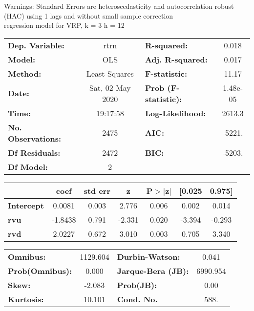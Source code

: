 Warnings: \newline
 [1] Standard Errors are heteroscedasticity and autocorrelation robust (HAC) using 1 lags and without small sample correction\\ 

regression model for VRP, k = 3 h = 12\begin{center}
\begin{tabular}{lclc}
\toprule
\textbf{Dep. Variable:}    &       rtrn       & \textbf{  R-squared:         } &     0.018   \\
\textbf{Model:}            &       OLS        & \textbf{  Adj. R-squared:    } &     0.017   \\
\textbf{Method:}           &  Least Squares   & \textbf{  F-statistic:       } &     11.17   \\
\textbf{Date:}             & Sat, 02 May 2020 & \textbf{  Prob (F-statistic):} &  1.48e-05   \\
\textbf{Time:}             &     19:17:58     & \textbf{  Log-Likelihood:    } &    2613.3   \\
\textbf{No. Observations:} &        2475      & \textbf{  AIC:               } &    -5221.   \\
\textbf{Df Residuals:}     &        2472      & \textbf{  BIC:               } &    -5203.   \\
\textbf{Df Model:}         &           2      & \textbf{                     } &             \\
\bottomrule
\end{tabular}
\begin{tabular}{lcccccc}
                   & \textbf{coef} & \textbf{std err} & \textbf{z} & \textbf{P$> |$z$|$} & \textbf{[0.025} & \textbf{0.975]}  \\
\midrule
\textbf{Intercept} &       0.0081  &        0.003     &     2.776  &         0.006        &        0.002    &        0.014     \\
\textbf{rvu}       &      -1.8438  &        0.791     &    -2.331  &         0.020        &       -3.394    &       -0.293     \\
\textbf{rvd}       &       2.0227  &        0.672     &     3.010  &         0.003        &        0.705    &        3.340     \\
\bottomrule
\end{tabular}
\begin{tabular}{lclc}
\textbf{Omnibus:}       & 1129.604 & \textbf{  Durbin-Watson:     } &    0.041  \\
\textbf{Prob(Omnibus):} &   0.000  & \textbf{  Jarque-Bera (JB):  } & 6990.954  \\
\textbf{Skew:}          &  -2.083  & \textbf{  Prob(JB):          } &     0.00  \\
\textbf{Kurtosis:}      &  10.101  & \textbf{  Cond. No.          } &     588.  \\
\bottomrule
\end{tabular}
\end{center}

